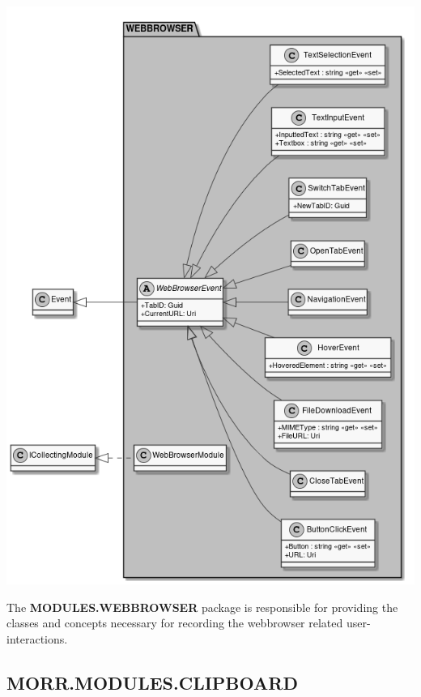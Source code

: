 \begin{center}
    \includegraphics[width=1.0\textwidth]{resources/Packages/MODULES_WEBBROWSER.png}
\end{center}

The \textbf{MODULES.WEBBROWSER} package is responsible for providing the classes and concepts necessary for recording the webbrowser related user-interactions.

\begin{packclass}
\end{packclass}

\newpage
\subsection*{MORR.MODULES.CLIPBOARD}

